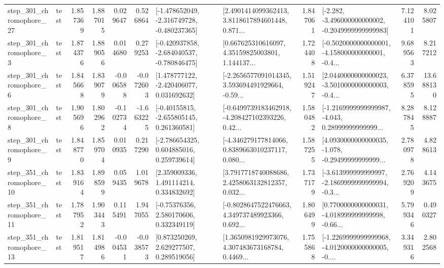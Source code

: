 \begin{tabular}{llrrrrllrlrr}
  step\_301\_chromophore\_27 &      test &      1.857369 &    1.887015 &      0.029647 &  0.526864 &  [-1.478652049, -2.316749728, -0.480237365] &  [2.4901414099362413, 3.8118617894601448, 0.871... &       1.847061 &  [-2.282, -3.496000000000002, -0.2049999999999983] &            7.124101 &          8.025807 \\
   step\_301\_chromophore\_3 &      test &      1.874376 &    1.889056 &      0.014680 &  0.279253 &  [-0.420937858, -2.684040537, -0.780846475] &  [0.667625310616097, 4.35159825003801, 1.144137... &       1.724408 &  [-0.5020000000000001, -4.158000000000001, -0.4... &            9.689563 &          8.217212 \\
   step\_301\_chromophore\_6 &      test &      1.845668 &    1.839079 &     -0.006588 & -0.072603 &    [1.478777122, -2.420406077, 0.031692632] &  [-2.2656577091014345, 3.593694491929664, -0.59... &       1.519247 &  [2.0440000000000023, -3.5010000000000003, -0.4... &            6.378595 &         13.688130 \\
   step\_301\_chromophore\_8 &      test &      1.905696 &    1.802962 &     -0.102734 & -1.663225 &    [-0.40155815, -2.655805145, 0.261360581] &  [-0.6499739183462918, -4.208427102393226, 0.42... &       1.580482 &  [-1.2169999999999987, -4.043, 0.28999999999999... &            8.287845 &          8.128887 \\
   step\_301\_chromophore\_9 &      test &      1.848770 &    1.859704 &      0.010935 &  0.217290 &    [-2.786654325, 0.604885016, 0.259739614] &  [-4.346279177814066, 0.8389663010237117, 0.080... &       1.587255 &  [4.0930000000000035, -1.078, -0.29499999999999... &            2.780978 &          4.828613 \\
  step\_351\_chromophore\_10 &      test &      1.839164 &    1.898599 &      0.059435 &  1.019678 &     [2.359009336, 1.491114214, 0.334832692] &  [3.7917718740088686, 2.4258063132812357, 0.032... &       1.737179 &  [-3.613999999999997, -2.1869999999999994, -0.3... &            2.769209 &          4.143675 \\
  step\_351\_chromophore\_11 &      test &      1.787952 &    1.903443 &      0.115491 &  1.947055 &     [-0.75376356, 2.580170606, 0.332349119] &  [-0.8028647522476663, 4.349737489923366, 0.692... &       1.806499 &  [0.7700000000000031, -4.018999999999998, -0.66... &            5.799346 &          0.490327 \\
  step\_351\_chromophore\_13 &      test &      1.819517 &    1.814986 &     -0.004531 & -0.038573 &     [0.873250269, 2.629277507, 0.289519056] &  [1.3650981929973076, 4.307483673168784, 0.4469... &       1.755868 &  [-1.2269999999999968, -4.0120000000000005, -0.... &            3.349316 &          2.802568 \\

\end{tabular}
